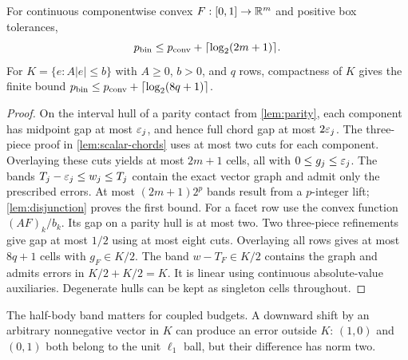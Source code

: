 \begin{proposition}\label{prop:finite-vector-overlay}
For continuous componentwise convex $F:[0,1]\to\mathbb R^m$ and positive box
tolerances,
\[
 p_{\mathrm{bin}}\le p_{\mathrm{conv}}+\lceil\log_2(2m+1)\rceil.
\]
For $K=\{e:A|e|\le b\}$ with $A\ge0$, $b>0$, and $q$ rows, compactness
of $K$ gives the finite bound
$p_{\mathrm{bin}}\le p_{\mathrm{conv}}+\lceil\log_2(8q+1)\rceil$.
\end{proposition}
\begin{proof}
On the interval hull of a parity contact from \cref{lem:parity},
each component has midpoint gap at most $\varepsilon_j$, and hence full chord
gap at most $2\varepsilon_j$. The three-piece proof in
\cref{lem:scalar-chords} uses at most two cuts for each component.
Overlaying these cuts yields at most $2m+1$ cells, all with
$0\le g_j\le\varepsilon_j$. The bands
$T_j-\varepsilon_j\le w_j\le T_j$ contain the exact vector graph and admit
only the prescribed errors. At most $(2m+1)2^p$ bands result from a
$p$-integer lift; \cref{lem:disjunction} proves the first bound.
For a facet row use the convex function $(AF)_k/b_k$. Its gap on a
parity hull is at most two. Two three-piece refinements give gap at
most $1/2$ using at most eight cuts. Overlaying all rows gives at most
$8q+1$ cells with $g_F\in K/2$. The band $w-T_F\in K/2$ contains
the graph and admits errors in $K/2+K/2=K$. It is linear using
continuous absolute-value auxiliaries. Degenerate hulls can be kept
as singleton cells throughout.
\end{proof}

The half-body band matters for coupled budgets. A downward shift by an
arbitrary nonnegative vector in $K$ can produce an error outside $K$:
$(1,0)$ and $(0,1)$ both belong to the unit $\ell_1$ ball, but their
difference has norm two.

